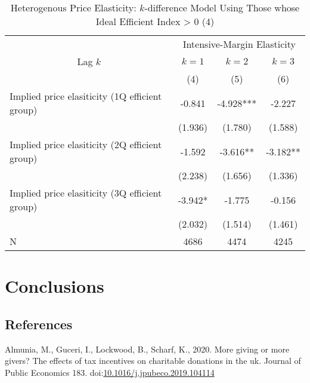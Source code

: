\documentclass[ review  , 3p ]{elsarticle}
\begin{document}
  \begin{table}
  
  \caption{\label{tab:kableSubsetHeterokDiffElasticitySlide4}Heterogenous Price Elasticity: $k$-difference Model Using Those whose Ideal Efficient Index > 0 (4)}
  \centering
  \fontsize{8}{10}\selectfont
  \begin{tabular}[t]{lccc}
  \toprule
  \multicolumn{1}{c}{ } & \multicolumn{3}{c}{Intensive-Margin Elasticity} \\
  \cmidrule(l{3pt}r{3pt}){2-4}
  \multicolumn{1}{c}{Lag $k$} & \multicolumn{1}{c}{$k = 1$} & \multicolumn{1}{c}{$k = 2$} & \multicolumn{1}{c}{$k = 3$} \\
  \cmidrule(l{3pt}r{3pt}){1-1} \cmidrule(l{3pt}r{3pt}){2-2} \cmidrule(l{3pt}r{3pt}){3-3} \cmidrule(l{3pt}r{3pt}){4-4}
   & (4) & (5) & (6)\\
  \midrule
  Implied price elasiticity (1Q efficient group) & -0.841 & -4.928*** & -2.227\\
   & (1.936) & (1.780) & (1.588)\\
  Implied price elasiticity (2Q efficient group) & -1.592 & -3.616** & -3.182**\\
   & (2.238) & (1.656) & (1.336)\\
  Implied price elasiticity (3Q efficient group) & -3.942* & -1.775 & -0.156\\
   & (2.032) & (1.514) & (1.461)\\
  N & 4686 & 4474 & 4245\\
  \bottomrule
  \end{tabular}
  \end{table}
  
  \hypertarget{conclusions}{%
  \section{Conclusions}\label{conclusions}}
  
  \hypertarget{references}{%
  \subsection*{References}\label{references}}
  
  \hypertarget{refs}{}
  \leavevmode\hypertarget{ref-Almunia2020}{}%
  Almunia, M., Guceri, I., Lockwood, B., Scharf, K., 2020. More giving or more givers? The effects of tax incentives on charitable donations in the uk. Journal of Public Economics 183. doi:\href{https://doi.org/10.1016/j.jpubeco.2019.104114}{10.1016/j.jpubeco.2019.104114}
  
\end{document}
